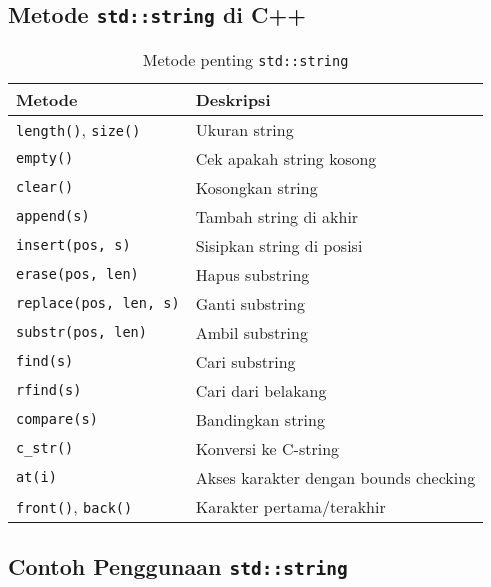 \documentclass[../main.tex]{subfiles}
\begin{document}
\subsection{Metode \texttt{std::string} di C++}

\begin{table}[H]
  \centering
  \caption{Metode penting \texttt{std::string}}
  \begin{tabular}{@{}lp{8cm}@{}}
    \toprule
    Metode & Deskripsi \\
    \midrule
    \texttt{length()}, \texttt{size()} & Ukuran string \\
    \texttt{empty()} & Cek apakah string kosong \\
    \texttt{clear()} & Kosongkan string \\
    \texttt{append(s)} & Tambah string di akhir \\
    \texttt{insert(pos, s)} & Sisipkan string di posisi \\
    \texttt{erase(pos, len)} & Hapus substring \\
    \texttt{replace(pos, len, s)} & Ganti substring \\
    \texttt{substr(pos, len)} & Ambil substring \\
    \texttt{find(s)} & Cari substring \\
    \texttt{rfind(s)} & Cari dari belakang \\
    \texttt{compare(s)} & Bandingkan string \\
    \texttt{c\_str()} & Konversi ke C-string \\
    \texttt{at(i)} & Akses karakter dengan bounds checking \\
    \texttt{front()}, \texttt{back()} & Karakter pertama/terakhir \\
    \bottomrule
  \end{tabular}
\end{table}

\subsection{Contoh Penggunaan \texttt{std::string}}
\end{document}
